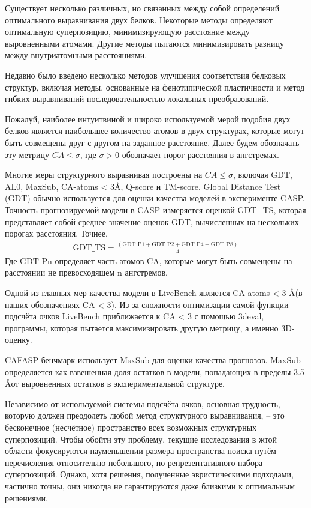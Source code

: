 \documentclass[a4papper]{article}
\newcommand{\angstrom}{\text\normalfont\AA}
\begin{document}
Существует несколько различных, но связанных между собой определений оптимального выравнивания двух белков. Некоторые методы определяют оптимальную суперпозицию, минимизирующую расстояние между выровненными атомами. Другие методы пытаются минимизировать разницу между внутриатомными расстояниями.

Недавно было введено несколько методов улучшения соответствия белковых структур, включая методы, основанные на фенотипической пластичности и метод гибких выравниваний последовательностью локальных преобразований.

Пожалуй, наиболее интуитвиной и широко используемой мерой подобия двух белков является наибольшее количество атомов в двух структурах, которые могут быть совмещены друг с другом на заданное расстояние. Далее будем обозначать эту метрицу $CA \leq \sigma$, где $\sigma > 0$ обозначает порог расстояния в ангстремах.

Многие меры структурного выравнивая построены на $CA \leq \sigma$, включая GDT, AL0, MaxSub, CA-atoms < 3\angstrom, Q-score и TM-score. Global Distance Test (GDT) обычно используется для оценки качества моделей в эксперименте CASP. Точность прогнозируемой модели в CASP измеряется оценкой GDT\_TS, которая представляет собой среднее значение оценок GDT, вычисленных на нескольких порогах расстояния. Точнее,
\begin{gather*}
\mathrm{GDT\_TS} = \frac{(\mathrm{GDT\_P1} + \mathrm{GDT\_P2} + \mathrm{GDT\_P4} + \mathrm{GDT\_P8})}{4}
\end{gather*}
Где $\mathrm{GDT\_Pn}$ определяет часть атомов CA, которые могут быть совмещены на расстоянии не превосходящем n ангстремов.

Одной из главных мер качества модели в LiveBench является CA-atoms < 3 \angstrom (в наших обозначениях CA < 3). Из-за сложности оптимизации самой функции подсчёта очков LiveBench приближается к CA < 3 с помощью 3deval, программы, которая пытается максимизировать другую метрицу, а именно 3D-оценку.

CAFASP бенчмарк использует MsxSub для оценки качества прогнозов. MaxSub определяется как взвешенная доля остатков в модели, попадающих в пределы 3.5 \angstrom от выровненных остатков в экспериментальной структуре.

Независимо от используемой системы подсчёта очков, основная трудность, которую должен преодолеть любой метод структурного выравнивания, -- это бесконечное (несчётное) пространство всех возможных структурных суперпозиций. Чтобы обойти эту проблему, текущие исследования в жтой области фокусируются науменьшении размера пространства поиска путём перечисления относительно небольшого, но репрезентативного набора суперпозиций. Однако, хотя решения, полученные эвристическими подходами, частично точны, они никогда не гарантируются даже близкими к оптимальным решениями.
\end{document}

